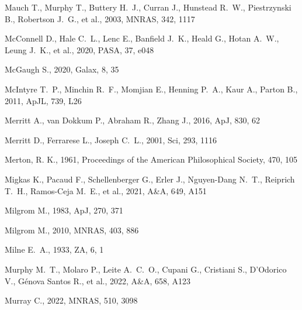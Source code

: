 \documentclass[fleqn,usenatbib]{mnras}
\begin{document}
\begin{thebibliography}{}
 Mauch T., Murphy T., Buttery H.~J., Curran J., Hunstead R.~W., Piestrzynski B., Robertson J.~G., et al., 2003, MNRAS, 342, 1117

 McConnell D., Hale C.~L., Lenc E., Banfield J.~K., Heald G., Hotan A.~W., Leung J.~K., et al., 2020, PASA, 37, e048

 McGaugh S., 2020, Galax, 8, 35

 McIntyre T.~P., Minchin R.~F., Momjian E., Henning P.~A., Kaur A., Parton B., 2011, ApJL, 739, L26

 Merritt A., van Dokkum P., Abraham R., Zhang J., 2016, ApJ, 830, 62

 Merritt D., Ferrarese L., Joseph C.~L., 2001, Sci, 293, 1116

 Merton, R. K., 1961, Proceedings of the American Philosophical Society, 470, 105

 Migkas K., Pacaud F., Schellenberger G., Erler J., Nguyen-Dang N.~T., Reiprich T.~H., Ramos-Ceja M.~E., et al., 2021, A\&A, 649, A151

 Milgrom M., 1983, ApJ, 270, 371

 Milgrom M., 2010, MNRAS, 403, 886

 Milne E.~A., 1933, ZA, 6, 1


 Murphy M.~T., Molaro P., Leite A.~C.~O., Cupani G., Cristiani S., D'Odorico V., G{\'e}nova Santos R., et al., 2022, A\&A, 658, A123

 Murray C., 2022, MNRAS, 510, 3098


\end{thebibliography}
\end{document}
